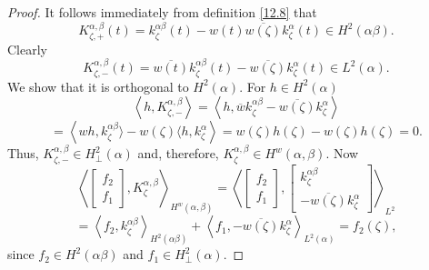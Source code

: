 \documentclass[reqno,11pt,centertags]{article}
\newcommand{\z}{\zeta}
\theoremstyle{definition}
\def\a{\alpha}
\def\z{\zeta}
\begin{document}
\begin{proof}
It follows immediately from definition \eqref{12.8} that
$$
K_{\zeta,+}^{\alpha, \beta}(t)=
k^{\alpha\beta}_\zeta(t)-w(t)\overline{w(\zeta)} k^\alpha_\zeta(t)
\in H^2(\alpha\beta).
$$
Clearly
$$
K_{\zeta,-}^{\alpha, \beta}(t)=
\overline{w(t)}k^{\alpha\beta}_\zeta(t)-\overline{w(\zeta)} k^\alpha_\zeta(t)\in L^2(\a).
$$
We show that it is orthogonal to $H^2(\a)$. For $h\in H^2(\a)$
$$
\left\langle h, K_{\zeta,-}^{\alpha, \beta}\right\rangle=
\left\langle h, \overline w k^{\alpha\beta}_\zeta-\overline{w(\zeta)} k^\alpha_\zeta\right\rangle
$$
$$
=
\left\langle w h, k^{\alpha\beta}_\zeta\rangle-w(\z)\langle h, k^\alpha_\zeta\right\rangle
=w(\z) h(\z) - w(\z) h(\z)=0.
$$
Thus, $K_{\zeta,-}^{\alpha, \beta}\in H^2_\perp(\a)$ and, therefore,
$K_{\zeta}^{\alpha, \beta}\in H^w(\alpha, \beta)$.
Now
$$
\left\langle\begin{bmatrix} f_2 \\ f_1 \end{bmatrix}, K_{\zeta}^{\alpha, \beta}\right\rangle_{H^w(\alpha, \beta)}
=
\left\langle\begin{bmatrix} f_2 \\ f_1 \end{bmatrix},
\begin{bmatrix} k^{\alpha\beta}_\zeta \\
-\overline{w(\zeta)} k^\alpha_\zeta \end{bmatrix}
\right\rangle_{L^2}
$$
$$
=
\left\langle f_2 , k^{\alpha\beta}_\zeta \right\rangle_{H^2(\alpha\beta)}
+
\left\langle f_1 , -\overline{w(\zeta)} k^{\alpha}_\zeta \right\rangle_{L^2 (\alpha)}
= f_2(\zeta),
$$
since $f_2\in H^2(\alpha\beta)$ and $f_1\in H^2_\perp(\alpha)$.


\end{proof}
\end{document}
